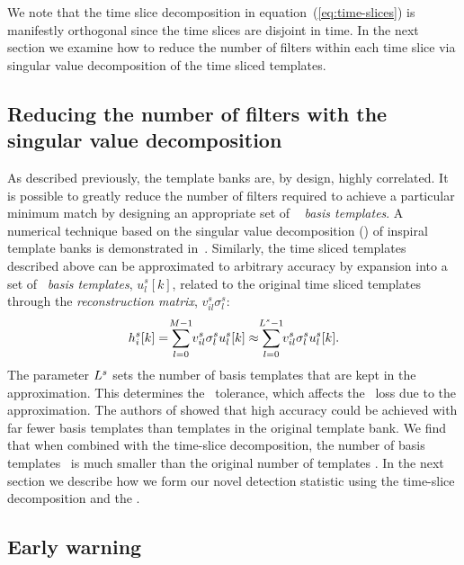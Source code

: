 We note that the time slice decomposition in equation~(\ref{eq:time-slices}) is
manifestly orthogonal since the time slices are disjoint in time.  In the next
section we examine how to reduce the number of filters within each time slice
via singular value decomposition of the time sliced templates.

\subsection{Reducing the number of filters with the singular value
decomposition}

As described previously, the template banks are, by design, highly correlated.
It is possible to greatly reduce the number of filters required to achieve a
particular minimum match by designing an appropriate set of \SVD\ {\em
basis templates}.  A numerical technique based on the singular value
decomposition (\SVD) of inspiral template banks is demonstrated
in~\cite{Cannon:2010p10398}.  Similarly, the time sliced templates described
above can be approximated to arbitrary accuracy by expansion into a set of
\SVD\ \emph{basis templates}, $u_l^s[k]$, related to the original time
sliced templates through the \emph{reconstruction matrix},
$v_{il}^s\sigma_l^s$:
%
\begin{equation}
h_i^s[k] = \sum_{\mathclap{l=0}}^{\mathclap{M-1}} v_{il}^s \sigma_l^s u_l^s[k] \approx \sum_{\mathclap{l=0}}^{\mathclap{L^s-1}} v_{il}^s \sigma_l^s u_l^s[k].
\label{eq:svddecomp}
\end{equation}
%
%
%
The parameter $L^s$ sets the number of basis templates that are kept in
the approximation.  This determines the \SVD\ tolerance, which affects the
\SNR\ loss due to the approximation.  The authors of \cite{Cannon:2010p10398}
showed that high accuracy could be achieved with far fewer basis templates than
templates in the original template bank.  We find that when combined with the
time-slice decomposition, the number of basis templates \numsvdtmps\ is much
smaller than the original number of templates \numtmps.  In the next section we
describe how we form our novel detection statistic using the time-slice
decomposition and the \SVD.

\subsection{Early warning \SNR }

